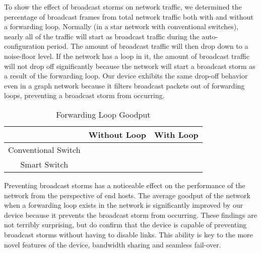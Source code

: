     To show the effect of broadcast storms on network traffic, we determined the percentage of broadcast frames from total network traffic both with and without a forwarding loop.
    Normally (in a star network with conventional switches), nearly all of the traffic will start as broadcast traffic during the auto-configuration period.
    The amount of broadcast traffic will then drop down to a noise-floor level.
    If the network has a loop in it, the amount of broadcast traffic will not drop off significantly because the network will start a broadcast storm as a result of the forwarding loop.
    Our device exhibits the same drop-off behavior even in a graph network because it filters broadcast packets out of forwarding loops, preventing a broadcast storm from occurring.

    \begin{table}[ht]
	    \centering
	    \caption{Forwarding Loop Goodput}
	    \label{tab:goodput}
	    \begin{tabular}{|c|c|c|}
		    \hline
		    & Without Loop	& With Loop \\
		    \hline
		    Conventional Switch	&	& \\
		    \hline
		    Smart Switch				&	& \\
		    \hline
	    \end{tabular}
    \end{table}

    Preventing broadcast storms has a noticeable effect on the performance of the network from the perspective of end hosts.
    The average goodput of the network when a forwarding loop exists in the network is significantly improved by our device because it prevents the broadcast storm from occurring.
    These findings are not terribly surprising, but do confirm that the device is capable of preventing broadcast storms without having to disable links.
    This ability is key to the more novel features of the device, bandwidth sharing and seamless fail-over.

